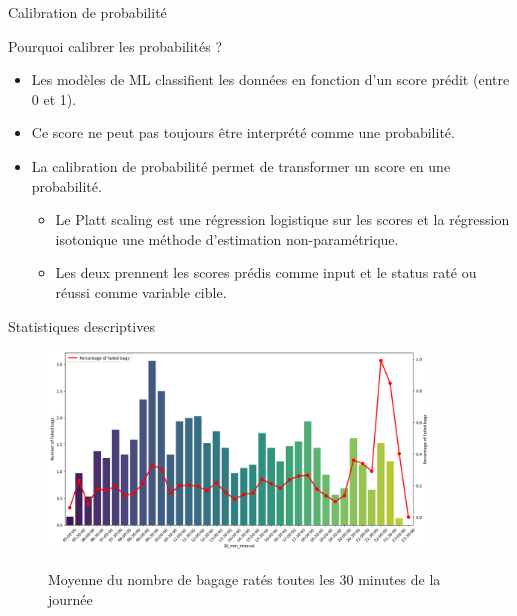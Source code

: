 \documentclass{beamer}
\begin{document}
\begin{frame}{Calibration de probabilité}

Pourquoi calibrer les probabilités ?
\begin{itemize}
    \item Les modèles de ML classifient les données en fonction d'un score prédit (entre 0 et 1).
    \item Ce score ne peut pas toujours être interprété comme une probabilité.
    \item La calibration de probabilité permet de transformer un score en une probabilité.
    \begin{itemize}
        \item Le Platt scaling est une régression logistique sur les scores et la régression isotonique une méthode d'estimation non-paramétrique. 
        \item Les deux prennent les scores prédis comme input et le status raté ou réussi comme variable cible.
    \end{itemize}
\end{itemize}

    
\end{frame}




\begin{frame}{Statistiques descriptives}
\begin{figure}[h]
    \centering
    \includegraphics[width=0.9\textwidth]{Number and percentage of failed bags within a day.png}\\
    \caption{Moyenne du nombre de bagage ratés toutes les 30 minutes de la journée}
    \label{fig:Average number and percentage of mishandled bags each 30 minutes of the day}
\end{figure}

\end{frame}
\end{document}
